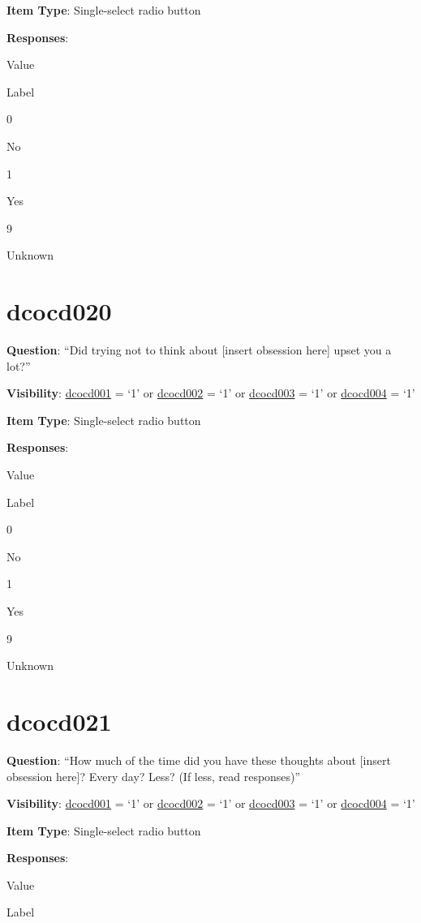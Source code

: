 \documentclass[]{book}
\begin{document}
\textbf{Item Type}: Single-select radio button

\textbf{Responses}:

Value

Label

0

No

1

Yes

9

Unknown

\hypertarget{dcocd020}{%
\section{dcocd020}\label{dcocd020}}

\textbf{Question}: ``Did trying not to think about {[}insert obsession here{]} upset you a lot?''

\textbf{Visibility}: \protect\hyperlink{dcocd001}{dcocd001} = `1' or \protect\hyperlink{dcocd002}{dcocd002} = `1' or \protect\hyperlink{dcocd003}{dcocd003} = `1' or \protect\hyperlink{dcocd004}{dcocd004} = `1'

\textbf{Item Type}: Single-select radio button

\textbf{Responses}:

Value

Label

0

No

1

Yes

9

Unknown

\hypertarget{dcocd021}{%
\section{dcocd021}\label{dcocd021}}

\textbf{Question}: ``How much of the time did you have these thoughts about {[}insert obsession here{]}? Every day? Less? (If less, read responses)''

\textbf{Visibility}: \protect\hyperlink{dcocd001}{dcocd001} = `1' or \protect\hyperlink{dcocd002}{dcocd002} = `1' or \protect\hyperlink{dcocd003}{dcocd003} = `1' or \protect\hyperlink{dcocd004}{dcocd004} = `1'

\textbf{Item Type}: Single-select radio button

\textbf{Responses}:

Value

Label
\end{document}
